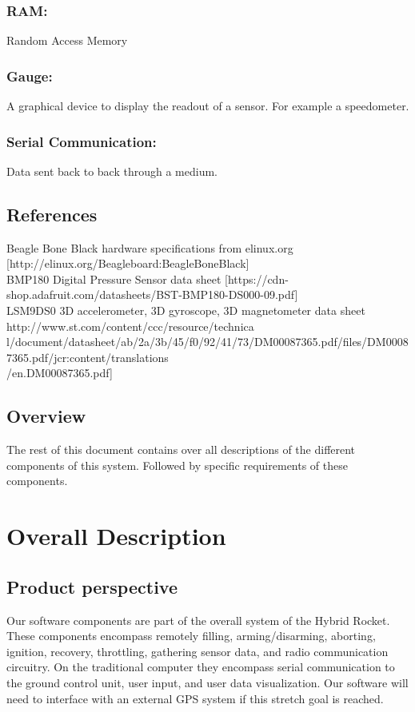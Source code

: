 \documentclass[10pt,draftclsnofoot,onecolumn,compsoc]{IEEEtran}
\begin{document}
\subsubsection{\bf RAM:}Random Access Memory
\subsubsection{\bf Gauge:}A graphical device to display the readout of a sensor. For example a speedometer.
\subsubsection{\bf Serial Communication:}Data sent back to back through a medium.

\subsection{ References}
Beagle Bone Black hardware specifications from elinux.org [http://elinux.org/Beagleboard:BeagleBoneBlack]\\
BMP180 Digital Pressure Sensor data sheet [https://cdn-shop.adafruit.com/datasheets/BST-BMP180-DS000-09.pdf]\\
LSM9DS0 3D accelerometer, 3D gyroscope, 3D magnetometer data sheet http://www.st.com/content/ccc/resource/technica\\l/document/datasheet/ab/2a/3b/45/f0/92/41/73/DM00087365.pdf/files/DM00087365.pdf/jcr:content/translations\\/en.DM00087365.pdf]
\subsection{Overview}
The rest of this document contains over all descriptions of the different components of this system. Followed by specific requirements of these components.

\section{ Overall Description}
\subsection{ Product perspective}
Our software components are part of the overall system of the Hybrid Rocket. These components encompass remotely filling, arming/disarming, aborting, ignition, recovery, throttling, gathering sensor data, and radio communication circuitry.  On the traditional computer they encompass serial communication to the ground control unit, user input, and user data visualization. Our software will need to interface with an external GPS system if this stretch goal is reached. 
\end{document}
